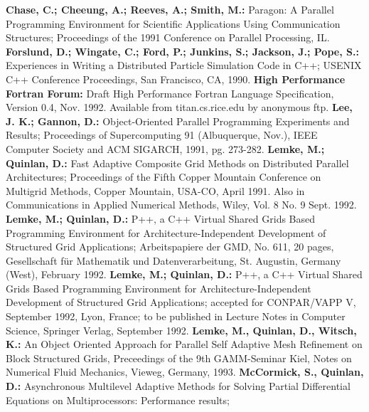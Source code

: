 \begin{thebibliography}{WW}
   {\bf Chase, C.; Cheeung, A.; Reeves, A.; Smith, M.: }
   Paragon: A Parallel Programming Environment for Scientific Applications
   Using Communication Structures; Proceedings of the 1991 Conference
   on Parallel Processing, IL.
   {\bf Forslund, D.; Wingate, C.; Ford, P.; Junkins, S.; Jackson, J.; Pope, S.:}
   Experiences in Writing a Distributed Particle Simulation Code in C++;
   USENIX C++ Conference Proceedings, San Francisco, CA, 1990.
   {\bf High Performance Fortran Forum: }
   Draft High Performance Fortran Language Specification, Version 0.4,
   Nov. 1992. Available from titan.cs.rice.edu by anonymous ftp.
   {\bf Lee, J. K.; Gannon, D.: }
   Object-Oriented Parallel Programming Experiments and Results;
   Proceedings of Supercomputing 91 (Albuquerque, Nov.), IEEE Computer
   Society and ACM SIGARCH, 1991, pg. 273-282.
   {\bf Lemke, M.; Quinlan, D.:}
   Fast Adaptive Composite Grid Methods on Distributed Parallel Architectures;
   Proceedings of the Fifth Copper Mountain Conference on Multigrid
   Methods, Copper Mountain, USA-CO, April 1991. Also in Communications in Applied 
   Numerical Methods, Wiley, Vol. 8 No. 9 Sept. 1992.
   {\bf Lemke, M.; Quinlan, D.:}
   P++, a C++ Virtual Shared Grids Based Programming
   Environment for Architecture-Independent Development 
   of Structured Grid Applications; Arbeitspapiere der GMD, No. 611, 20 pages,
   Gesellschaft f\"{u}r Mathematik und Datenverarbeitung, 
   St. Augustin, Germany (West), February 1992.
   {\bf Lemke, M.; Quinlan, D.:}
   P++, a C++ Virtual Shared Grids Based Programming
   Environment for Architecture-Independent Development 
   of Structured Grid Applications; accepted for CONPAR/VAPP V, September
   1992, Lyon, France; to be published in Lecture Notes in Computer Science,
   Springer Verlag, September 1992.
   {\bf Lemke, M., Quinlan, D., Witsch, K.:}
   An Object Oriented Approach for Parallel Self Adaptive
   Mesh Refinement on Block Structured Grids, Preceedings of
   the 9th GAMM-Seminar Kiel, Notes on Numerical Fluid Mechanics,
   Vieweg, Germany, 1993.
   {\bf McCormick, S., Quinlan, D.:}
   Asynchronous Multilevel Adaptive Methods for Solving Partial Differential
   Equations on Multiprocessors: Performance results;

\end{thebibliography}
